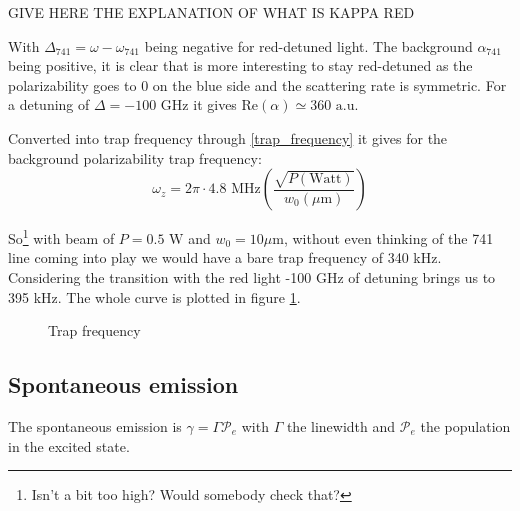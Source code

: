 \documentclass[reprint,amsmath,amssymb,aps,nofootinbib]{revtex4-1}
\begin{document}
GIVE HERE THE EXPLANATION OF WHAT IS KAPPA RED

With $\Delta_{741} = \omega - \omega_{741}$ being negative for red-detuned light. The background $\alpha_{741}$ being positive, it is clear that is more interesting to stay red-detuned as the polarizability goes to 0 on the blue side and the scattering rate is symmetric. For a detuning of $\Delta = -100 \text{ GHz}$ it gives $\text{Re}(\alpha) \simeq 360\text{ a.u.}$

Converted into trap frequency through \ref{trap_frequency} it gives for the background polarizability trap frequency:
\begin{equation}
\omega_{z} = 2\pi\cdot 4.8\text{ MHz}\left( \frac{\sqrt{P(\text{Watt})}}{w_{0}(\mu\text{m})}\right)
\end{equation}

So\footnote{Isn't a bit too high? Would somebody check that?} with beam of $P = 0.5\text{ W}$ and $w_{0} = 10\mu\text{m}$, without even thinking of the 741 line coming into play we would have a bare trap frequency of 340 kHz. Considering the transition with the red light -100 GHz of detuning brings us to 395 kHz. The whole curve is plotted in figure \ref{trap_frequency_image}.

\begin{figure}
\begin{center}
\caption{\label{trap_frequency_image}Trap frequency}
\end{center}
\end{figure}


\subsection{Spontaneous emission}

The spontaneous emission is $\gamma = \Gamma\mathcal{P}_{e}$ with $\Gamma$ the linewidth and $\mathcal{P}_{e}$ the population in the excited state. 
\end{document}
